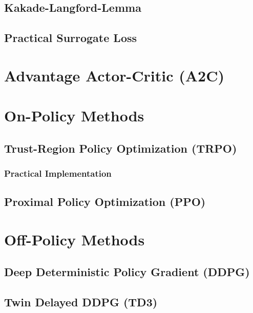 		\subsection{Kakade-Langford-Lemma} %

		\subsection{Practical Surrogate Loss} %

	\section{Advantage Actor-Critic (A2C)} %

	\section{On-Policy Methods} %

		\subsection{Trust-Region Policy Optimization (TRPO)} %

			\subsubsection{Practical Implementation} %

		\subsection{Proximal Policy Optimization (PPO)} %

	\section{Off-Policy Methods} %

		\subsection{Deep Deterministic Policy Gradient (DDPG)} %

		\subsection{Twin Delayed DDPG (TD3)} %

